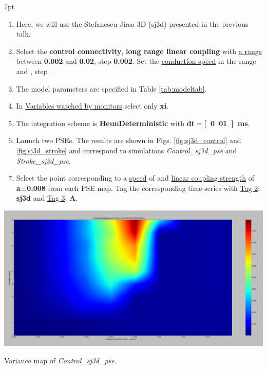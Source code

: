 \documentclass{tufte-handout}
\newenvironment{simulation}{%
  \def\FrameCommand{%
    \hspace{1pt}%
    {\color{ForestGreen}\vrule width 2pt}%
    {\color{simulationshade}\vrule width 4pt}%
    \colorbox{simulationshade}%
  }%
  \MakeFramed{\advance\hsize-\width\FrameRestore}%
  \noindent\hspace{-4.55pt}%
  \begin{adjustwidth}{}{7pt}%
  \vspace{2pt}\vspace{2pt}%
}
{%
  \vspace{2pt}\end{adjustwidth}\endMakeFramed%
}
\begin{document}
  \begin{simulation}
  \begin{enumerate}
  \item Here, we will use the Stefanescu-Jirsa 3D (sj3d) presented in the previous talk. 
  \item Select the \textbf{control connectivity}, \textbf{long range linear coupling} with \underline{a range} between \textbf{0.002} and \textbf{0.02}, step \textbf{0.002}. Set the \underline{conduction speed} in the range \textbf{} and \textbf{}, step \textbf{}.
  \item The model parameters are specified in Table \ref{tab:modeltab}. 
  \item In \underline{Variables watched by monitors} select only \textbf{xi}.
  \item The integration scheme is \textbf{HeunDeterministic} with \textbf{dt}$\mathbf{=}$\textbf{\unit[0.01]{ms}}.
  \item Launch two PSEs. The results are shown in Figs. \ref{fig:sj3d_control} and \ref{fig:sj3d_stroke} and correspond to simulations
  \textit{Control\_sj3d\_pse} and \textit{Stroke\_sj3d\_pse}.
  \item Select the point corresponding to a \underline{speed} of \textbf{} and \underline{linear coupling strength} of \textbf{a=0.008} from each PSE map. Tag the corresponding time-series with \underline{Tag 2}: \textbf{sj3d} and \underline{Tag 3}: \textbf{A}. 
   \end{enumerate}
\end{simulation}



\begin{marginfigure}%
  \includegraphics[width=0.82\linewidth]{Handout_UI_ModellingStructuralLesions_ControlSJ3DPSE}
    \caption{Variance map of \textit{Control\_sj3d\_pse}.}
  \label{fig:sj3d_control}
  \end{marginfigure}
  
\end{document}
